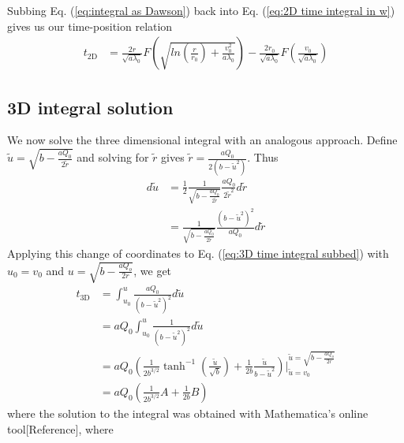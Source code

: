 \documentclass[aps,prl,twocolumn,showpacs,superscriptaddress,groupedaddress]{revtex4-1}  %
\begin{document}
Subbing Eq. (\ref{eq:integral as Dawson}) back into Eq. (\ref{eq:2D time integral in w}) gives us our time-position relation
\begin{align}\label{eq:2D time vs r}
  t_\text{2D} &= \frac{2 r}{\sqrt{a \lambda_0}} F\left(\sqrt{ln\left(\frac{r}{r_0}\right) + \frac{v_0^2}{a \lambda_0}}\right) - \frac{2 r_0}{\sqrt{a \lambda_0}} F\left(\frac{v_0}{\sqrt{a \lambda_0}}\right)
\end{align}

\subsection{3D integral solution}
We now solve the three dimensional integral with an analogous approach.  Define $\tilde{u} = \sqrt{b - \frac{a Q_0}{2 \tilde{r} }}$ and solving for $\tilde{r}$ gives
$\tilde{r} =  \frac{a Q_0}{2(b - \tilde{u}^2)}$.  Thus
\begin{align}
  d \tilde{u} &= \frac{1}{2} \frac{1}{\sqrt{b - \frac{a Q_0}{2 \tilde{r} }}}\frac{a Q_0}{2 \tilde{r}^2 } d \tilde{r}\nonumber\\
                  &= \frac{1}{\sqrt{b - \frac{a Q_0}{2 \tilde{r} }}} \frac{(b - \tilde{u}^2)^2}{a Q_0} d\tilde{r}\nonumber
\end{align}
Applying this change of coordinates to Eq. (\ref{eq:3D time integral subbed}) with
$u_0 = v_0 $ and $u = \sqrt{b - \frac{a Q_o}{2  r}}$, we get
\begin{align}
  t_\text{3D} &= \int_{u_0}^{u} \frac{a Q_0}{(b - \tilde{u}^2)^2} d \tilde{u}\nonumber\\
                    &= a Q_0 \int_{u_0}^{u} \frac{1}{(b - \tilde{u}^2)^2} d \tilde{u} \nonumber\\   
                    &= a Q_0 \left( \frac{1}{2 b^{3/2}} \tanh^{-1} \left( \frac{\tilde{u}}{\sqrt{b}}\right) + \frac{1}{2 b} \frac{\tilde{u}}{b - \tilde{u}^2}\right) \bigg \rvert_{\tilde{u} = v_0}^{\tilde{u} = \sqrt{b - \frac{a Q_o}{2  r}}}\nonumber\\
                    &= a Q_0 \left( \frac{1}{2 b^{3/2}} A + \frac{1}{2 b} B \right )\label{eq:3D time u}
\end{align}
where the solution to the integral was obtained with Mathematica's online tool[Reference],
where
\end{document}

